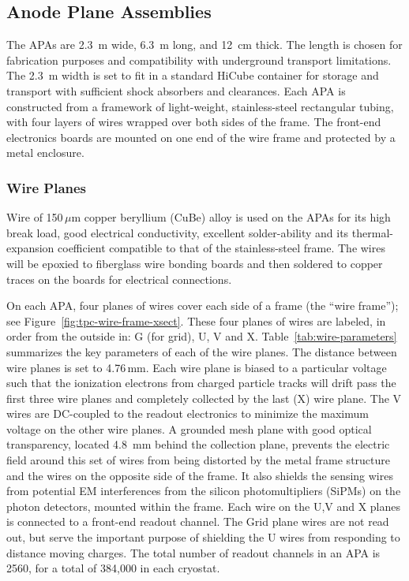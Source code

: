 \subsection{Anode Plane Assemblies}
\label{subsec:fd-ref-apa}

The APAs are 2.3~m wide, 6.3~m long, and 12~cm thick. The length is chosen for fabrication purposes and compatibility with underground transport limitations. The 2.3~m width is set to fit in a standard HiCube container for storage and transport with sufficient shock absorbers and clearances. 
Each APA is constructed from a framework of light-weight, stainless-steel rectangular tubing, with four layers of wires wrapped over both sides of the frame. The front-end electronics boards are mounted on one end of the wire frame and protected by a metal enclosure.  


\subsubsection{Wire Planes}
\label{subsec:fd-ref-wireplanes}

Wire of 150\,$\mu$m copper beryllium (CuBe) alloy is used on the APAs for its high break load, good electrical conductivity, excellent solder-ability and its thermal-expansion coefficient compatible to that of the stainless-steel frame.  The wires will be epoxied to fiberglass wire bonding boards and then soldered to copper traces on the boards for electrical connections.

On each APA, four planes of wires cover each side of a frame (the ``wire frame''); see Figure~\ref{fig:tpc-wire-frame-xsect}.
These four planes of wires are labeled, in order from the outside in: G (for grid), U, V and X.  
Table~\ref{tab:wire-parameters} summarizes the key parameters of each of the wire planes.  The distance between wire planes is set to 4.76\,mm.  Each wire plane is biased to a particular voltage such that the ionization electrons from charged particle tracks will drift pass the first three wire planes and completely collected by the last (X) wire plane.  The V wires are DC-coupled to the readout electronics to minimize the maximum voltage on the other wire planes.
A grounded mesh plane with good optical transparency, located 4.8~mm behind the collection plane, prevents the electric field around this set of wires from being distorted by the metal frame structure and the wires on the opposite side of the frame. It also shields the sensing wires from potential EM interferences from the silicon photomultipliers (SiPMs) on the photon detectors, mounted within the frame.  
Each wire on the U,V and X planes is connected to a front-end readout channel. The Grid plane wires are not read out, but serve the important purpose of shielding the U wires from responding to distance moving charges. The total number of readout channels in an APA is 2560, for a total of 384,000 in each cryostat.



